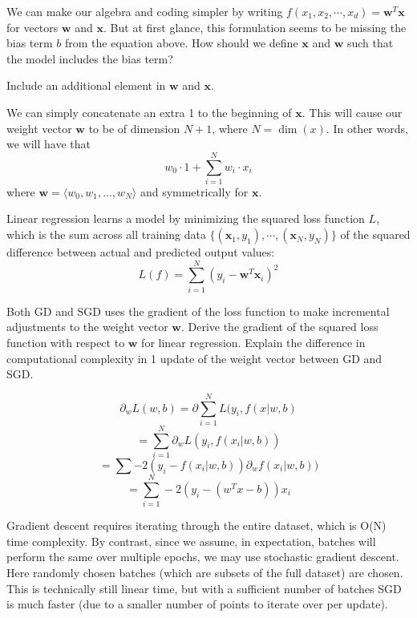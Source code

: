 \begin{problem}[1]
  We can make our algebra and coding simpler by writing $f(x_1, x_2, \cdots, x_d) = \mathbf{w}^T\mathbf{x}$ for vectors $\mathbf{w}$ and $\mathbf{x}$.  But at first glance, this formulation seems to be missing the bias term $b$ from the equation above.  How should we define $\mathbf{x}$ and $\mathbf{w}$ such that the model includes the bias term?
\end{problem}
\begin{hint}
  Include an additional element in $\mathbf{w}$ and $\mathbf{x}$.
\end{hint}
\begin{solution}
  We can simply concatenate an extra 1 to the beginning of $\textbf{x}$. This will cause our weight vector $\textbf{w}$ to be of dimension $N + 1$, where $N = \dim(x)$. In other words, we will have that
  $$
  w_0 \cdot 1 + \sum_{i=1}^N w_i \cdot x_i
  $$
  where $\textbf{w} = \langle w_0, w_1, ..., w_N \rangle$ and symmetrically for $\textbf{x}$.
\end{solution}

Linear regression learns a model by minimizing the squared loss function $L$, which is the sum across all training data $\{(\mathbf{x}_1, y_1),\cdots,(\mathbf{x}_N, y_N)\}$ of the squared difference between actual and predicted output values:
\[L(f) = \sum_{i=1}^N (y_i - \mathbf{w}^T\mathbf{x}_i)^2\]

\begin{problem}[2]
  Both GD and SGD uses the gradient of the loss function to make incremental adjustments to the weight vector $\mathbf{w}$. Derive the gradient of the squared loss function with respect to $\mathbf{w}$ for linear regression. Explain the difference in computational complexity in 1 update of the weight vector between GD and SGD. 
\end{problem}
\begin{solution}
  $$
  \partial_w L(w,b) = \partial \sum_{i = 1}^N L(y_i,f(x | w,b)
  $$$$
  = \sum_{i = 1}^N \partial_w L(y_i, f(x_i | w, b))
  $$$$
  = \sum -2(y_i - f(x_i | w, b))\partial_w f(x_i | w,b))
  $$$$
  = \sum_{i=1}^N -2(y_i - (w^Tx - b))x_i
  $$

  Gradient descent requires iterating through the entire dataset, which is O(N) time complexity. By contrast, since we assume, in expectation, batches will perform the same over multiple epochs, we may use stochastic gradient descent. Here randomly chosen batches (which are subsets of the full dataset) are chosen. This is technically still linear time, but with a sufficient number of batches SGD is much faster (due to a smaller number of points to iterate over per update).
\end{solution}

